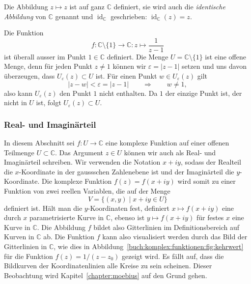 \begin{beispiel}
Die Abbildung $z\mapsto z$ ist auf ganz $\mathbb{C}$ definiert,
sie wird auch die \emph{identische Abbildung} von $\mathbb{C}$
%
genannt und $\operatorname{id}_{\mathbb{C}}$ geschrieben:
$\operatorname{id}_{\mathbb{C}}(z)=z$.
\end{beispiel}

\begin{beispiel}
Die Funktion
\[
f
\colon
\mathbb{C}\setminus\{1\}
\to
\mathbb{C}
:
z\mapsto \frac{1}{z-1}
\]
ist überall ausser im Punkt $1\in\mathbb{C}$ definiert.
Die Menge $U=\mathbb{C}\setminus\{1\}$ ist eine offene Menge, denn
für jeden Punkt $z\ne 1$ können wir $\varepsilon = |z-1|$ setzen
und uns davon überzeugen, dass $U_{\varepsilon}(z)\subset U$ ist.
Für einen Punkt $w\in U_{\varepsilon}(z)$ gilt
\[
|z-w|<\varepsilon = |z-1|
\qquad\Rightarrow\qquad
w\ne 1,
\]
also kann $U_\varepsilon(z)$ den Punkt $1$ nicht enthalten.
Da $1$ der einzige Punkt ist, der nicht in $U$ ist, folgt
$U_\varepsilon(z)\subset U$.
\end{beispiel}

%
%
\subsubsection{Real- und Imaginärteil}
In diesem Abschnitt sei $f\colon U\to\mathbb{C}$ eine komplexe Funktion
auf einer offenen Teilmenge $U\subset\mathbb{C}$.
Das Argument $z\in U$ können wir auch als Real- und Imaginärteil
schreiben.
%
%
Wir verwenden die Notation $x+iy$, sodass der Realteil die
$x$-Koordinate in der gaussschen Zahlenebene ist und der Imaginärteil
die $y$-Koordinate.
Die komplexe Funktion $f(z)=f(x+iy)$ wird somit zu einer Funktion
von zwei reellen Variablen, die auf der Menge
\[
V
=
\{
(x,y)
\mid
x+iy\in U
\}
\]
definiert ist.
Hält man die $y$-Koordinaten fest, definiert $x\mapsto f(x+iy)$ 
eine durch $x$ parametrisierte Kurve in $\mathbb{C}$,
ebenso ist $y\mapsto f(x+iy)$ für festes $x$ eine Kurve in $\mathbb{C}$.
Die Abbildung $f$ bildet also Gitterlinien im Definitionsbereich auf
Kurven in $\mathbb{C}$ ab.
%
Die Funktion $f$ kann also visualisiert werden durch das Bild der
Gitterlinien in $\mathbb{C}$, wie dies in
%
Abbildung~\ref{buch:komplex:funktionen:fig:kehrwert}
für die Funktion $f(z) = 1/(z-z_0)$ gezeigt wird.
Es fällt auf, dass die Bildkurven der Koordinatenlinien alle Kreise
zu sein scheinen.
Dieser Beobachtung wird Kapitel~\ref{chapter:moebius}
auf den Grund gehen.

